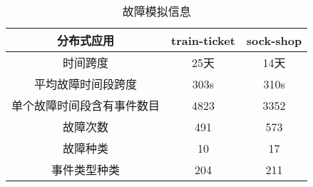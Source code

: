 \begin{table}[htbp]
    \caption{故障模拟信息}
    \centering
    \label{failure-simulation-info}
    \begin{tabular}{ccc}
    \toprule[2pt]
    分布式应用       & train-ticket & \multicolumn{1}{c}{sock-shop} \\ \midrule[2pt]
    时间跨度       & 25天          & 14天                           \\
    平均故障时间段跨度  & 303s         & 310s                          \\
    单个故障时间段含有事件数目 & 4823         & 3352                          \\
    故障次数       & 491          & 573                           \\
    故障种类       & 10           & 17                            \\
    事件类型种类     & 204          & 211                           \\ 
    \bottomrule[2pt]
    \end{tabular}
\end{table}


